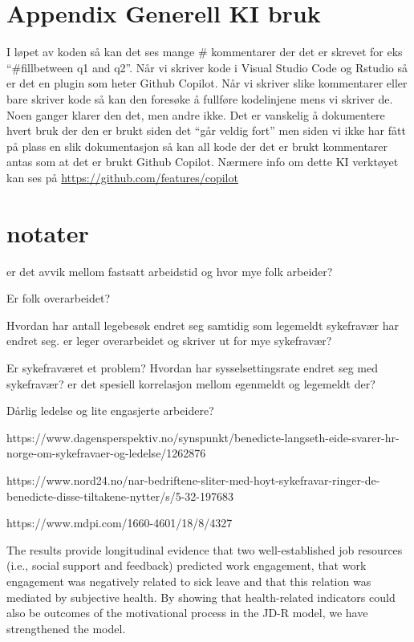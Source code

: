\documentclass[
  12pt,
  a4paper,
  DIV=11,
  numbers=noendperiod]{scrartcl}
\begin{document}
\clearpage

\appendix

\section {Appendix Generell KI bruk}

I løpet av koden så kan det ses mange \# kommentarer der det er skrevet
for eks ``\#fillbetween q1 and q2''. Når vi skriver kode i Visual Studio
Code og Rstudio så er det en plugin som heter Github Copilot. Når vi
skriver slike kommentarer eller bare skriver kode så kan den foresøke å
fullføre kodelinjene mens vi skriver de. Noen ganger klarer den det, men
andre ikke. Det er vanskelig å dokumentere hvert bruk der den er brukt
siden det ``går veldig fort'' men siden vi ikke har fått på plass en
slik dokumentasjon så kan all kode der det er brukt kommentarer antas
som at det er brukt Github Copilot. Nærmere info om dette KI verktøyet
kan ses på \url{https://github.com/features/copilot}

\clearpage

\section{notater}\label{notater}

er det avvik mellom fastsatt arbeidstid og hvor mye folk arbeider?

Er folk overarbeidet?

Hvordan har antall legebesøk endret seg samtidig som legemeldt
sykefravær har endret seg. er leger overarbeidet og skriver ut for mye
sykefravær?

Er sykefraværet et problem? Hvordan har sysselsettingsrate endret seg
med sykefravær? er det spesiell korrelasjon mellom egenmeldt og
legemeldt der?

Dårlig ledelse og lite engasjerte arbeidere?

https://www.dagensperspektiv.no/synspunkt/benedicte-langseth-eide-svarer-hr-norge-om-sykefravaer-og-ledelse/1262876

https://www.nord24.no/nar-bedriftene-sliter-med-hoyt-sykefravar-ringer-de-benedicte-disse-tiltakene-nytter/s/5-32-197683

https://www.mdpi.com/1660-4601/18/8/4327

The results provide longitudinal evidence that two well-established job
resources (i.e., social support and feedback) predicted work engagement,
that work engagement was negatively related to sick leave and that this
relation was mediated by subjective health. By showing that
health-related indicators could also be outcomes of the motivational
process in the JD-R model, we have strengthened the model.
\end{document}
